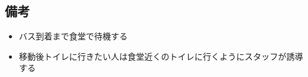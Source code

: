 \subsection{備考}
\begin{itemize}
  \item バス到着まで食堂で待機する
  \item 移動後トイレに行きたい人は食堂近くのトイレに行くようにスタッフが誘導する
\end{itemize}




%
